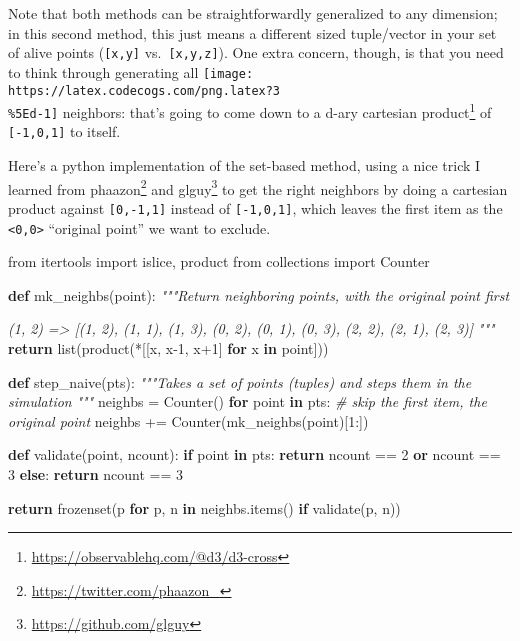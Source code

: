 \documentclass[]{article}
\newenvironment{Shaded}{}{}
\newcommand{\BuiltInTok}[1]{#1}
\newcommand{\CommentTok}[1]{\textcolor[rgb]{0.38,0.63,0.69}{\textit{#1}}}
\newcommand{\ControlFlowTok}[1]{\textcolor[rgb]{0.00,0.44,0.13}{\textbf{#1}}}
\newcommand{\DecValTok}[1]{\textcolor[rgb]{0.25,0.63,0.44}{#1}}
\newcommand{\ImportTok}[1]{#1}
\newcommand{\KeywordTok}[1]{\textcolor[rgb]{0.00,0.44,0.13}{\textbf{#1}}}
\newcommand{\NormalTok}[1]{#1}
\newcommand{\OperatorTok}[1]{\textcolor[rgb]{0.40,0.40,0.40}{#1}}
\renewcommand{\href}[2]{#2\footnote{\url{#1}}}
\begin{document}
Note that both methods can be straightforwardly generalized to any dimension; in
this second method, this just means a different sized tuple/vector in your set
of alive points (\texttt{{[}x,y{]}} vs.~\texttt{{[}x,y,z{]}}). One extra
concern, though, is that you need to think through generating all
\texttt{[image: https://latex.codecogs.com/png.latex?3\\\%5Ed-1]} neighbors:
that's going to come down to a d-ary
\href{https://observablehq.com/@d3/d3-cross}{cartesian product} of
\texttt{{[}-1,0,1{]}} to itself.

Here's a python implementation of the set-based method, using a nice trick I
learned from \href{https://twitter.com/phaazon_}{phaazon} and
\href{https://github.com/glguy}{glguy} to get the right neighbors by doing a
cartesian product against \texttt{{[}0,-1,1{]}} instead of
\texttt{{[}-1,0,1{]}}, which leaves the first item as the
\texttt{\textless{}0,0\textgreater{}} ``original point'' we want to exclude.

\begin{Shaded}
\begin{Highlighting}[]
\ImportTok{from}\NormalTok{ itertools }\ImportTok{import}\NormalTok{ islice, product}
\ImportTok{from}\NormalTok{ collections }\ImportTok{import}\NormalTok{ Counter}

\KeywordTok{def}\NormalTok{ mk\_neighbs(point):}
    \CommentTok{"""Return neighboring points, with the original point first}

\CommentTok{    (1, 2)}
\CommentTok{    => [(1, 2), (1, 1), (1, 3), (0, 2), (0, 1), (0, 3), (2, 2), (2, 1), (2, 3)]}
\CommentTok{    """}
    \ControlFlowTok{return} \BuiltInTok{list}\NormalTok{(product(}\OperatorTok{*}\NormalTok{[[x, x}\DecValTok{{-}1}\NormalTok{, x}\OperatorTok{+}\DecValTok{1}\NormalTok{] }\ControlFlowTok{for}\NormalTok{ x }\KeywordTok{in}\NormalTok{ point]))}

\KeywordTok{def}\NormalTok{ step\_naive(pts):}
    \CommentTok{"""Takes a set of points (tuples) and steps them in the simulation}
\CommentTok{    """}
\NormalTok{    neighbs }\OperatorTok{=}\NormalTok{ Counter()}
    \ControlFlowTok{for}\NormalTok{ point }\KeywordTok{in}\NormalTok{ pts:}
        \CommentTok{\# skip the first item, the original point}
\NormalTok{        neighbs }\OperatorTok{+=}\NormalTok{ Counter(mk\_neighbs(point)[}\DecValTok{1}\NormalTok{:])}

    \KeywordTok{def}\NormalTok{ validate(point, ncount):}
        \ControlFlowTok{if}\NormalTok{ point }\KeywordTok{in}\NormalTok{ pts:}
            \ControlFlowTok{return}\NormalTok{ ncount }\OperatorTok{==} \DecValTok{2} \KeywordTok{or}\NormalTok{ ncount }\OperatorTok{==} \DecValTok{3}
        \ControlFlowTok{else}\NormalTok{:}
            \ControlFlowTok{return}\NormalTok{ ncount }\OperatorTok{==} \DecValTok{3}

    \ControlFlowTok{return} \BuiltInTok{frozenset}\NormalTok{(p }\ControlFlowTok{for}\NormalTok{ p, n }\KeywordTok{in}\NormalTok{ neighbs.items() }\ControlFlowTok{if}\NormalTok{ validate(p, n))}
\end{Highlighting}
\end{Shaded}
\end{document}
